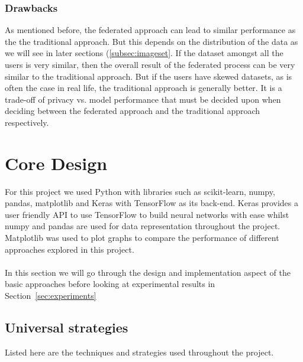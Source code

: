 \documentclass[12pt]{article}
\begin{document}
\subsubsection{Drawbacks}
As mentioned before, the federated approach can lead to similar performance as the the traditional approach. But this depends on the distribution of the data as we will see in later sections (\ref{subsec:imageset}. If the dataset amongst all the users is very similar, then the overall result of the federated process can be very similar to the traditional approach. But if the users have skewed datasets, as is often the case in real life, the traditional approach is generally better. It is a trade-off of privacy vs. model performance that must be decided upon when deciding between the federated approach and the traditional approach respectively.
\clearpage

\section{Core Design}
For this project we used Python with libraries such as scikit-learn, numpy, pandas, matplotlib and Keras with TensorFlow as its back-end. Keras provides a user friendly API to use TensorFlow to build neural networks with ease whilst numpy and pandas are used for data representation throughout the project. Matplotlib was used to plot graphs to compare the performance of different approaches explored in this project.
\\\\
In this section we will go through the design and implementation aspect of the basic approaches before looking at experimental results in Section~\ref{sec:experiments}
\subsection{Universal strategies}
Listed here are the techniques and strategies used throughout the project. 
\end{document}
